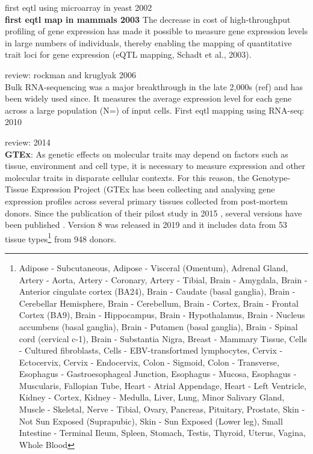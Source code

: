 first eqtl using microarray in yeast 2002 \cite{brem2002genetic}\\

\textbf{first eqtl map in mammals 2003}
The decrease in cost of high-throughput profiling of gene expression has made it possible to measure gene expression levels in large numbers of individuals, thereby enabling the mapping of quantitative trait loci for gene expression (eQTL mapping, Schadt et al., 2003). \cite{schadt2003genetics}

review: rockman and kruglyak 2006 \cite{rockman2006genetics}\\

Bulk RNA-sequencing was a major breakthrough in the late 2,000s (ref) and has been widely used since.
It measures the average expression level for each gene across a large population (N=) of input cells. 
First eqtl mapping using RNA-seq: 2010
\cite{montgomery2010transcriptome, pickrell2010understanding}

review: 2014 \cite{westra2014genome}\\

\textbf{GTEx}:
As genetic effects on molecular traits may depend on factors such as tissue, environment and cell type, it is necessary to measure expression and other molecular traits in disparate cellular contexts. 
For this reason, the Genotype-Tissue Expression Project (GTEx has been collecting and analysing gene expression profiles across several primary tissues collected from post-mortem donors.
Since the publication of their pilost study in 2015 \cite{gtex2015genotype}, several versions have been published \cite{gtex2017genetic, aguet2019gtex}.
Version 8 was released in 2019 and it includes data from 53 tissue types\footnote{Adipose - Subcutaneous, Adipose - Visceral (Omentum), Adrenal Gland, Artery - Aorta, Artery - Coronary, Artery - Tibial, 
Brain - Amygdala, Brain - Anterior cingulate cortex (BA24), Brain - Caudate (basal ganglia), Brain - Cerebellar Hemisphere, Brain - Cerebellum, Brain - Cortex, Brain - Frontal Cortex (BA9), Brain - Hippocampus, Brain - Hypothalamus, Brain - Nucleus accumbens (basal ganglia), Brain - Putamen (basal ganglia), Brain - Spinal cord (cervical c-1), Brain - Substantia Nigra, 
Breast - Mammary Tissue, Cells - Cultured fibroblasts, Cells - EBV-transfortmed lymphocytes,  Cervix - Ectocervix, Cervix - Endocervix, Colon - Sigmoid, Colon - Transverse, Esophagus - Gastroesophageal Junction, Esophagus - Mucosa, Esophagus - Muscularis, Fallopian Tube, Heart - Atrial Appendage, Heart - Left Ventricle, Kidney - Cortex, Kidney - Medulla, Liver, Lung,  Minor Salivary Gland, Muscle - Skeletal, Nerve - Tibial, Ovary, Pancreas, Pituitary, Prostate,  Skin - Not Sun Exposed (Suprapubic), Skin - Sun Exposed (Lower leg), Small Intestine - Terminal Ileum, Spleen, Stomach, Testis, Thyroid, Uterus, Vagina, Whole Blood} from 948 donors.

